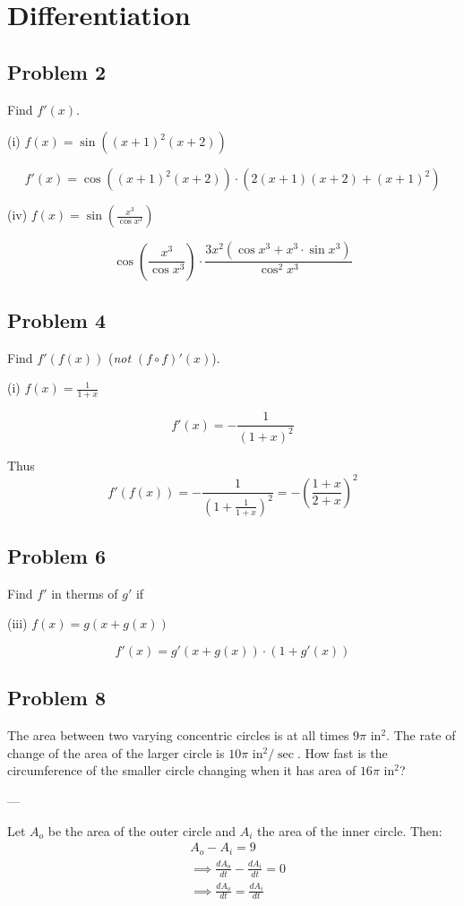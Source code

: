 
\section{Differentiation}

\subsection*{Problem 2}
Find $f'(x)$.

\vs

(i) $f(x)=\sin((x+1)^2(x+2))$

\[f'(x)=\cos((x+1)^2(x+2))\cdot(2(x+1)(x+2)+(x+1)^2)\]

\vs

(iv) $f(x)=\sin\left(\frac{x^3}{\cos x^3}\right)$

\[\cos\left(\frac{x^3}{\cos x^3}\right)\cdot \frac{3x^2(\cos x^3+x^3\cdot \sin
    x^3)}{\cos^2 x^3}\]


\subsection*{Problem 4}
Find $f'(f(x))$ (\textit{not} $(f\circ f)'(x)$).

\vs

(i) $f(x)=\frac{1}{1+x}$

\[f'(x)=-\frac{1}{(1+x)^2}\]

Thus
\[f'(f(x))=-\frac{1}{(1+\frac{1}{1+x})^2}=-\left(\frac{1+x}{2+x}\right)^2\]

\subsection*{Problem 6}
Find $f'$ in therms of $g'$ if

\vs

(iii) $f(x)=g(x+g(x))$

\[f'(x)=g'(x+g(x))\cdot (1+g'(x))\]

\subsection*{Problem 8}
The area between two varying concentric circles is at all times $9\pi$
in$^{2}$. The rate of change of the area of the larger circle is
$10\pi$ in$^2/\sec$. How fast is the circumference of the smaller circle
changing when it has area of $16\pi$ in$^2$?

\vs---\vs

Let $A_o$ be the area of the outer circle and $A_i$ the area of the
inner circle. Then:
\begin{align*}
  &A_o-A_i=9\\
  &\implies \frac{dA_o}{dt}-\frac{dA_i}{dt}=0\\
  &\implies \frac{dA_o}{dt}=\frac{dA_i}{dt}\\
\end{align*}

